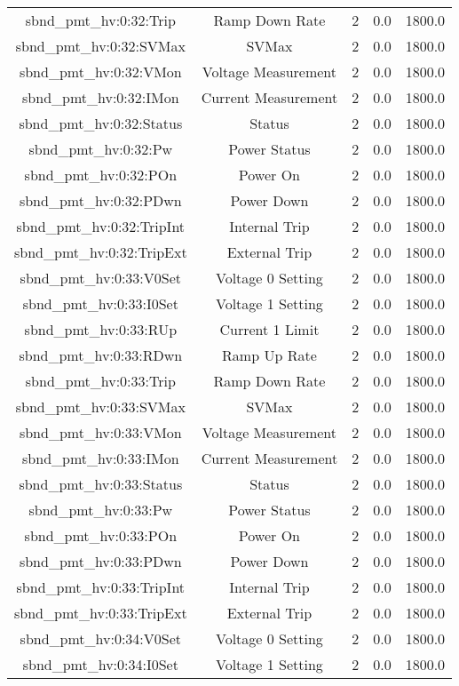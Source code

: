 \begin{center}
\begin{longtable}{c | c c c c }
sbnd\_pmt\_hv:0:32:Trip & Ramp Down Rate & 2 & 0.0 & 1800.0\\ 
sbnd\_pmt\_hv:0:32:SVMax & SVMax & 2 & 0.0 & 1800.0\\ 
sbnd\_pmt\_hv:0:32:VMon & Voltage Measurement & 2 & 0.0 & 1800.0\\ 
sbnd\_pmt\_hv:0:32:IMon & Current Measurement & 2 & 0.0 & 1800.0\\ 
sbnd\_pmt\_hv:0:32:Status & Status & 2 & 0.0 & 1800.0\\ 
sbnd\_pmt\_hv:0:32:Pw & Power Status & 2 & 0.0 & 1800.0\\ 
sbnd\_pmt\_hv:0:32:POn & Power On & 2 & 0.0 & 1800.0\\ 
sbnd\_pmt\_hv:0:32:PDwn & Power Down & 2 & 0.0 & 1800.0\\ 
sbnd\_pmt\_hv:0:32:TripInt & Internal Trip & 2 & 0.0 & 1800.0\\ 
sbnd\_pmt\_hv:0:32:TripExt & External Trip & 2 & 0.0 & 1800.0\\ 
sbnd\_pmt\_hv:0:33:V0Set & Voltage 0 Setting & 2 & 0.0 & 1800.0\\ 
sbnd\_pmt\_hv:0:33:I0Set & Voltage 1 Setting & 2 & 0.0 & 1800.0\\ 
sbnd\_pmt\_hv:0:33:RUp & Current 1 Limit & 2 & 0.0 & 1800.0\\ 
sbnd\_pmt\_hv:0:33:RDwn & Ramp Up Rate & 2 & 0.0 & 1800.0\\ 
sbnd\_pmt\_hv:0:33:Trip & Ramp Down Rate & 2 & 0.0 & 1800.0\\ 
sbnd\_pmt\_hv:0:33:SVMax & SVMax & 2 & 0.0 & 1800.0\\ 
sbnd\_pmt\_hv:0:33:VMon & Voltage Measurement & 2 & 0.0 & 1800.0\\ 
sbnd\_pmt\_hv:0:33:IMon & Current Measurement & 2 & 0.0 & 1800.0\\ 
sbnd\_pmt\_hv:0:33:Status & Status & 2 & 0.0 & 1800.0\\ 
sbnd\_pmt\_hv:0:33:Pw & Power Status & 2 & 0.0 & 1800.0\\ 
sbnd\_pmt\_hv:0:33:POn & Power On & 2 & 0.0 & 1800.0\\ 
sbnd\_pmt\_hv:0:33:PDwn & Power Down & 2 & 0.0 & 1800.0\\ 
sbnd\_pmt\_hv:0:33:TripInt & Internal Trip & 2 & 0.0 & 1800.0\\ 
sbnd\_pmt\_hv:0:33:TripExt & External Trip & 2 & 0.0 & 1800.0\\ 
sbnd\_pmt\_hv:0:34:V0Set & Voltage 0 Setting & 2 & 0.0 & 1800.0\\ 
sbnd\_pmt\_hv:0:34:I0Set & Voltage 1 Setting & 2 & 0.0 & 1800.0\\ 

\end{longtable}
\end{center}
